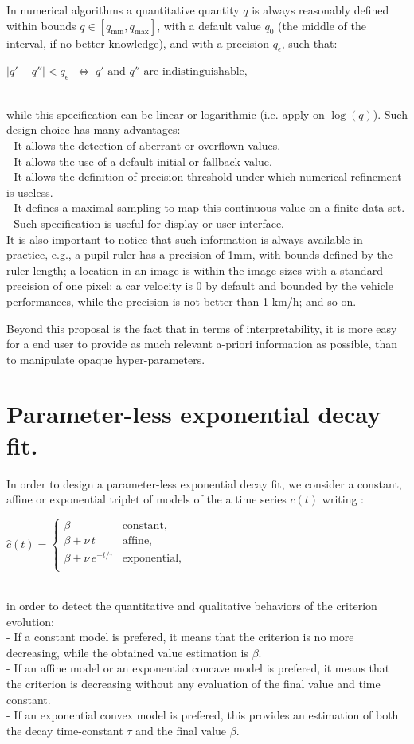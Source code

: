 \documentclass{article}
\newcommand{\eqline}[1]{\\\centerline{$#1$}\\}
\begin{document}
In numerical algorithms a quantitative quantity $q$ is always reasonably defined within bounds $q \in [q_{\min}, q_{\max}]$, with a default value $q_0$ (the middle of the interval, if no better knowledge), and with a precision $q_\epsilon$, such that:
\eqline{|q' - q''| < q_\epsilon \;\;\Leftrightarrow\; \mbox{$q'$ and $q''$ are indistinguishable},}
while this specification can be linear or logarithmic (i.e. apply on $\log(q)$).
Such design choice has many advantages:
\\- It allows the detection of aberrant or overflown values.
\\- It allows the use of a default initial or fallback value.
\\- It allows the definition of precision threshold under which numerical refinement is useless.
\\- It defines a maximal sampling to map this continuous value on a finite data set.
\\- Such specification is useful for display or user interface.
\\ It is also important to notice that such information is always available in practice, e.g., a pupil ruler has a precision of 1mm, with bounds defined by the ruler length; a location in an image is within the image sizes with a standard precision of one pixel; a car velocity is 0 by default and bounded by the vehicle performances, while the precision is not better than 1 km/h; and so on.

Beyond this proposal is the fact that in terms of interpretability, it is more easy for a end user to provide as much relevant a-priori information as possible, than to manipulate opaque hyper-parameters.

\clearpage \section{Parameter-less exponential decay fit.} \label{about-decay-fit}

In order to design a parameter-less exponential decay fit, we consider a constant, affine or exponential triplet of models of the a time series $c(t)$ writing :
\eqline{\hat{c}(t) = \left\{\begin{array}{ll} 
 \beta                      & \mbox{constant,} \\
 \beta + \nu \, t           & \mbox{affine,} \\
 \beta + \nu \, e^{-t/\tau} & \mbox{exponential,} \\
\end{array}\right.}
in order to detect the quantitative and qualitative behaviors of the criterion evolution:
\\- If a constant model is prefered, it means that the criterion is no more decreasing, while the obtained value estimation is $\beta$.
\\- If an affine model or an exponential concave model is prefered, it means that the criterion is decreasing without any evaluation of the final value and time constant.
\\- If an exponential convex model is prefered, this provides an estimation of both the decay time-constant $\tau$ and the final value $\beta$.
\end{document}
